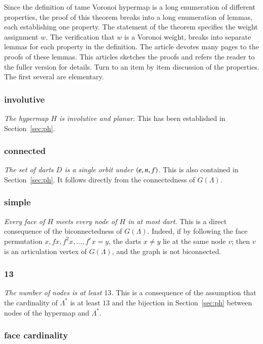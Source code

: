 \documentclass{article} %
\begin{document}
Since the definition of tame Voronoi hypermap is a long enumeration of different properties,
the proof of this theorem breaks into a long enumeration of lemmas, each establishing
one property.  The statement of the theorem specifies the weight assignment $w$.  The
verification that $w$ is a Voronoi weight, breaks into separate lemmas for each property in the definition.  The article \cite{arx} devotes
many pages to the proofs of these lemmas.  This articles sketches the proofs and
refers the reader to the fuller version for details.
Turn to an item by item discussion of the properties.  The first several
are elementary.

\subsubsection{involutive}
{\it The hypermap $H$ is involutive and planar.}  This has been established in Section~\ref{sec:ph}.


\subsubsection{connected}
{\it The set of darts $D$  is a single orbit under $\langle e,n,f\rangle$.}  This is also
contained in Section~\ref{sec:ph}. It follows directly from the
connectedness of $G(\Lambda)$.

\subsubsection{simple}

{\it Every face of $H$ meets every node of $H$ in at most
dart.}  This is a direct consequence of the biconnectedness of $G(\Lambda)$.
Indeed, if by following the face permutation $x,f x, f^2 x,\ldots, f^r x= y$,
the darts $x\ne y$ lie at the same node $v$; then $v$ is an articulation vertex
of $G(\Lambda)$, and the graph is not biconnected.

\subsubsection{13}

{\it The number of nodes is at least $13$.}  This is a consequence of the assumption
that the cardinality of $\Lambda^*$ is at least $13$ and the bijection in
Section~\ref{sec:ph} between nodes of the hypermap and $\Lambda^*$.

\subsubsection{face cardinality}\label{sec:face}
\end{document}
